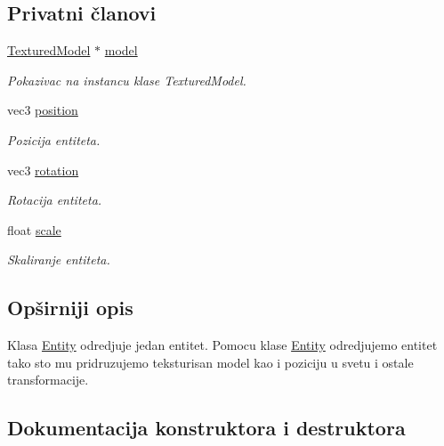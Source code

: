 \subsection*{Privatni članovi}
\begin{DoxyCompactItemize}
\item 
\hyperlink{classmodel_1_1TexturedModel}{Textured\+Model} $\ast$ \hyperlink{classentity_1_1Entity_ac7848c5d47d4b2bf12c84ddbbc32052a}{model}
\begin{DoxyCompactList}\small\item\em Pokazivac na instancu klase Textured\+Model. \end{DoxyCompactList}\item 
vec3 \hyperlink{classentity_1_1Entity_ad409c7f2085024479b276c2b6948bddb}{position}
\begin{DoxyCompactList}\small\item\em Pozicija entiteta. \end{DoxyCompactList}\item 
vec3 \hyperlink{classentity_1_1Entity_aedb4c5dc1cfbc8cb3f6deb565ea920cb}{rotation}
\begin{DoxyCompactList}\small\item\em Rotacija entiteta. \end{DoxyCompactList}\item 
float \hyperlink{classentity_1_1Entity_a59e5d5e3575df70cd5c74b5d739d84ca}{scale}
\begin{DoxyCompactList}\small\item\em Skaliranje entiteta. \end{DoxyCompactList}\end{DoxyCompactItemize}


\subsection{Opširniji opis}
Klasa \hyperlink{classentity_1_1Entity}{Entity} odredjuje jedan entitet. Pomocu klase \hyperlink{classentity_1_1Entity}{Entity} odredjujemo entitet tako sto mu pridruzujemo teksturisan model kao i poziciju u svetu i ostale transformacije. 

\subsection{Dokumentacija konstruktora i destruktora}
\mbox{\label{classentity_1_1Entity_a1668042c968a630c82bbbcec8520400e}} 
